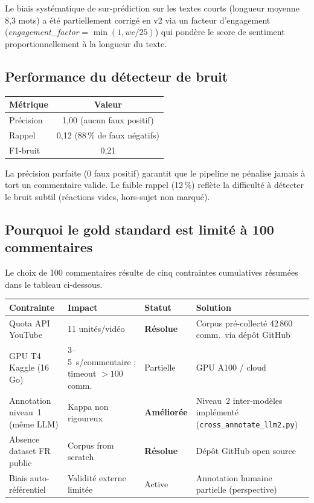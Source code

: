\documentclass[12pt, a4paper]{article}
\begin{document}
Le biais systématique de sur-prédiction sur les textes courts
(longueur moyenne 8{,}3 mots) a été partiellement corrigé en v2 via
un facteur d'engagement (\textit{engagement\_factor} = $\min(1, wc/25)$)
qui pondère le score de sentiment proportionnellement à la longueur du texte.

\subsection{Performance du détecteur de bruit}

\begin{center}
\begin{tabular}{lc}
\toprule
Métrique & Valeur \\
\midrule
Précision   & 1{,}00 (aucun faux positif) \\
Rappel      & 0{,}12 (88\,\% de faux négatifs) \\
F1-bruit    & 0{,}21 \\
\bottomrule
\end{tabular}
\end{center}

La précision parfaite (0 faux positif) garantit que le pipeline ne pénalise
jamais à tort un commentaire valide. Le faible rappel (12\,\%) reflète la
difficulté à détecter le bruit subtil (réactions vides, hors-sujet non marqué).

\subsection{Pourquoi le gold standard est limité à 100 commentaires}

Le choix de 100 commentaires résulte de cinq contraintes cumulatives résumées
dans le tableau ci-dessous.

\begin{center}
\small
\begin{tabular}{p{3.2cm}p{3.5cm}p{2cm}p{4cm}}
\toprule
\textbf{Contrainte} & \textbf{Impact} & \textbf{Statut} & \textbf{Solution} \\
\midrule
Quota API YouTube & 11 unités/vidéo & \textcolor{green!60!black}{\textbf{Résolue}} &
  Corpus pré-collecté 42\,860 comm.\ via dépôt GitHub \\
GPU T4 Kaggle (16 Go) & 3--5~s/commentaire ; timeout $> 100$ comm. & Partielle &
  GPU A100 / cloud \\
Annotation niveau~1 (même LLM) & Kappa non rigoureux & \textcolor{orange!80!black}{\textbf{Améliorée}} &
  Niveau~2 inter-modèles implémenté (\texttt{cross\_annotate\_llm2.py}) \\
Absence dataset FR public & Corpus from scratch & \textcolor{green!60!black}{\textbf{Résolue}} &
  Dépôt GitHub open source \\
Biais auto-référentiel & Validité externe limitée & Active &
  Annotation humaine partielle (perspective) \\
\bottomrule
\end{tabular}
\end{center}
\end{document}
